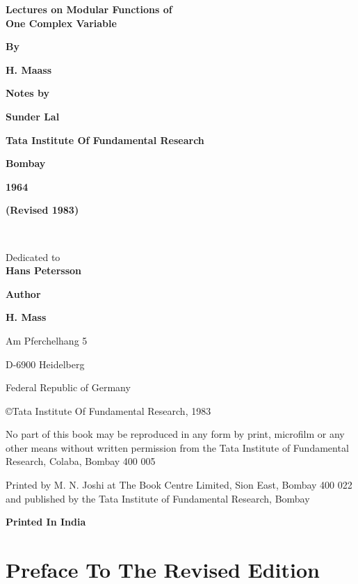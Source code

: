 \thispagestyle{empty}
\phantom{a}
\begin{center}
{\Large\bf Lectures on Modular Functions of\\[8pt] One Complex Variable}
\vskip 1cm

{\bf By}
\medskip

{\large\bf H. Maass}
\vfill

{\bf Notes by}
\medskip

{\large\bf Sunder Lal}
\vfill

{\bf Tata Institute Of Fundamental Research}

{\bf Bombay}

{\bf 1964}

{\bf (Revised 1983)}

\end{center}
\eject

~\thispagestyle{empty}
\vfill

\begin{center}
Dedicated to\\[0.75cm]
{\large\bfseries Hans Petersson}
\end{center}

\vfill
\eject
\thispagestyle{empty}

\begin{center}
{\bf Author}
\medskip

{\large\bf H. Mass}

Am Pferchelhang 5

D-6900 Heidelberg 

Federal Republic of Germany
\vfill

\copyright Tata Institute Of Fundamental Research, 1983
\vfill 


\parbox{0.7\textwidth}{No part of this book may be reproduced in any 
form by print, microfilm or any other means without written permission
from the Tata Institute of Fundamental Research, Colaba, Bombay 400 005}
\vskip 1cm    

\parbox{0.7\textwidth}{Printed by M. N. Joshi at The Book Centre Limited,
Sion East, Bombay 400 022 and published by the Tata Institute of Fundamental Research,
Bombay}
\vfill

\centerline{{\bf Printed In India}}
\end{center} 

\eject
\thispagestyle{empty}
\chapter*{Preface To The Revised Edition}


